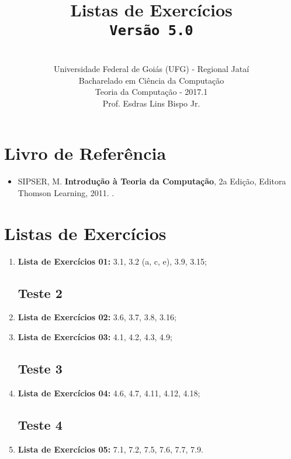 \documentclass[12pt,a4paper,oneside]{article}
\author{\\Universidade Federal de Goiás (UFG) - Regional Jataí\\Bacharelado em Ciência da Computação \\Teoria da Computação - 2017.1 \\Prof. Esdras Lins Bispo Jr.}
\date{}
\title{
	\sc \huge Listas de Exercícios
	\\{\tt Versão 5.0}
}
\begin{document}
\maketitle

\section{Livro de Referência}
	\begin{itemize}
		\item SIPSER, M. {\bf Introdução à Teoria da Computação}, 2a Edição, Editora Thomson Learning, 2011. \color{blue}{\bf Código Bib.: [004 SIP/int]}.
	\end{itemize}
	
\section{Listas de Exercícios}

\begin{enumerate}

	\subsection{Teste 1}
	\item[] {\bf Lista de Exercícios 01:} 3.1, 3.2 (a, c, e), 3.9, 3.15;
	
	\subsection{Teste 2}
	
	\item[] {\bf Lista de Exercícios 02:} 3.6, 3.7, 3.8, 3.16;
	\item[] {\bf Lista de Exercícios 03:} 4.1, 4.2, 4.3, 4.9;
	
	\subsection{Teste 3}
		
	\item[] {\bf Lista de Exercícios 04:} 4.6, 4.7, 4.11, 4.12, 4.18;
	
	\subsection{Teste 4}
	
	\item[] {\bf Lista de Exercícios 05:} 7.1, 7.2, 7.5, 7.6, 7.7, 7.9.
	
\end{enumerate}
\end{document}
